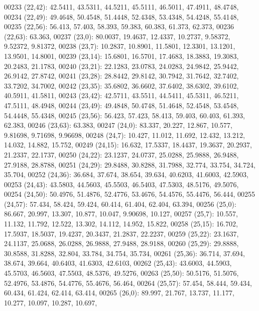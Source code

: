 \begin{DoxyCode}
00233       (22,42): 42.5411, 43.5311, 44.5211, 45.5111, 46.5011, 47.4911, 48.4748,
00234       (22,49): 49.4648, 50.4548, 51.4448, 52.4348, 53.4348, 54.4248, 55.4148,
00235       (22,56): 56.413, 57.403, 58.393, 59.383, 60.383, 61.373, 62.373,
00236       (22,63): 63.363,
00237       (23,0): 80.0037, 19.4637, 12.4337, 10.2737, 9.58372, 9.52372, 9.81372,
00238       (23,7): 10.2837, 10.8901, 11.5801, 12.3301, 13.1201, 13.9501, 14.8001,
00239       (23,14): 15.6801, 16.5701, 17.4683, 18.3883, 19.3083, 20.2483, 21.1783,
00240       (23,21): 22.1283, 23.0783, 24.0283, 24.9842, 25.9442, 26.9142, 27.8742,
00241       (23,28): 28.8442, 29.8142, 30.7942, 31.7642, 32.7402, 33.7202, 34.7002,
00242       (23,35): 35.6802, 36.6602, 37.6402, 38.6302, 39.6102, 40.5911, 41.5811,
00243       (23,42): 42.5711, 43.5511, 44.5411, 45.5311, 46.5211, 47.5111, 48.4948,
00244       (23,49): 49.4848, 50.4748, 51.4648, 52.4548, 53.4548, 54.4448, 55.4348,
00245       (23,56): 56.423, 57.423, 58.413, 59.403, 60.403, 61.393, 62.383,
00246       (23,63): 63.383,
00247       (24,0): 83.337, 20.227, 12.867, 10.577, 9.81698, 9.71698, 9.96698,
00248       (24,7): 10.427, 11.012, 11.692, 12.432, 13.212, 14.032, 14.882, 15.752,
00249       (24,15): 16.632, 17.5337, 18.4437, 19.3637, 20.2937, 21.2337, 22.1737,
00250       (24,22): 23.1237, 24.0737, 25.0288, 25.9888, 26.9488, 27.9188, 28.8788,
00251       (24,29): 29.8488, 30.8288, 31.7988, 32.774, 33.754, 34.724, 35.704,
00252       (24,36): 36.684, 37.674, 38.654, 39.634, 40.6203, 41.6003, 42.5903,
00253       (24,43): 43.5803, 44.5603, 45.5503, 46.5403, 47.5303, 48.5176, 49.5076,
00254       (24,50): 50.4976, 51.4876, 52.4776, 53.4676, 54.4576, 55.4476, 56.444,
00255       (24,57): 57.434, 58.424, 59.424, 60.414, 61.404, 62.404, 63.394,
00256       (25,0): 86.667, 20.997, 13.307, 10.877, 10.047, 9.90698, 10.127,
00257       (25,7): 10.557, 11.132, 11.792, 12.522, 13.302, 14.112, 14.952, 15.822,
00258       (25,15): 16.702, 17.5937, 18.5037, 19.4237, 20.3437, 21.2837, 22.2237,
00259       (25,22): 23.1637, 24.1137, 25.0688, 26.0288, 26.9888, 27.9488, 28.9188,
00260       (25,29): 29.8888, 30.8588, 31.8288, 32.804, 33.784, 34.754, 35.734,
00261       (25,36): 36.714, 37.694, 38.674, 39.664, 40.6403, 41.6303, 42.6103,
00262       (25,43): 43.6003, 44.5903, 45.5703, 46.5603, 47.5503, 48.5376, 49.5276,
00263       (25,50): 50.5176, 51.5076, 52.4976, 53.4876, 54.4776, 55.4676, 56.464,
00264       (25,57): 57.454, 58.444, 59.434, 60.434, 61.424, 62.414, 63.414,
00265       (26,0): 89.997, 21.767, 13.737, 11.177, 10.277, 10.097, 10.287, 10.697,

\end{DoxyCode}
